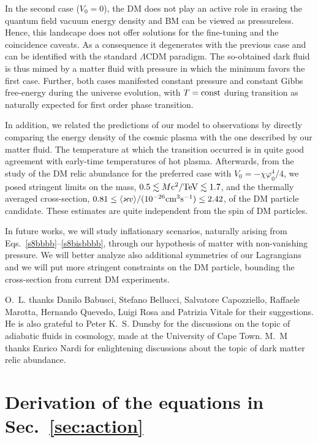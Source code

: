 \documentclass[twocolumn,showpacs, nofootinbib,aps,superscriptaddress, eqsecnum,prd,prl,notitlepage,showkeys,10pt,reprint]{revtex4-1}
\begin{document}
In the second case ($V_0=0$), the DM does not play an active role in erasing the quantum field vacuum energy density and BM can be viewed as pressureless. Hence, this landscape does not offer solutions for the fine-tuning and the coincidence caveats. As a consequence it degenerates with the previous case and can be identified with the standard $\Lambda$CDM paradigm. The so-obtained dark fluid is thus mimed by a matter fluid with pressure in which the minimum favors the first case. Further, both cases manifested constant pressure and constant Gibbs free-energy during the universe evolution, with $T={\rm const}$ during transition as naturally expected for first order phase transition.

In addition, we related the predictions of our model to observations by directly comparing the energy density of the cosmic plasma with the one described by our matter fluid. The temperature at which the transition occurred is in quite good agreement with early-time temperatures of hot plasma. Afterwards, from the study of the DM relic abundance for the preferred case with $V_0= -\chi\varphi_0^4/4$, we posed stringent limits on the mass, $0.5\lesssim M{\rm c^2/ TeV} \lesssim1.7$, and the thermally averaged cross-section, $0.81\leq\langle \varkappa v\rangle/(10^{-26}{\rm cm}^3{\rm s}^{-1})\leq2.42$, of the DM particle candidate. These estimates are quite independent from the spin of DM particles.

In future works, we will study inflationary scenarios, naturally arising from Eqs.~\eqref{s8bbbb}--\eqref{s8bisbbbb}, through our hypothesis of matter with non-vanishing pressure. We will better analyze also additional symmetries of our Lagrangians and we will put more stringent constraints on the DM particle, bounding the cross-section from current DM experiments.


\begin{acknowledgments}
O.~L. thanks Danilo Babusci, Stefano Bellucci, Salvatore Capozziello, Raffaele Marotta, Hernando Quevedo, Luigi Rosa and Patrizia Vitale for their suggestions. He is also grateful to Peter K.~S. Dunsby for the discussions on the topic of adiabatic fluids in cosmology, made at the University of Cape Town. M.~M thanks Enrico Nardi for enlightening discussions about the topic of dark matter relic abundance.
\end{acknowledgments}




\appendix
\section{Derivation of the equations in Sec.~\ref{sec:action}}
\label{appA}
\end{document}
